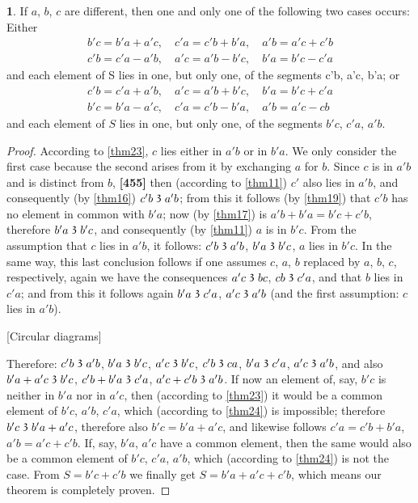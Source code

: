 \documentclass[leqno,hidelinks,a4paper]{article}
\theoremstyle{definition}
\newtheorem{satz}{\protect\satzname}
\newcommand{\satzname}{}
\renewcommand{\satzname}{\hspace{-4pt}.\ Satz}%
\renewcommand{\satzname}{\hspace{-4pt}.\ Theorem}%
\newcommand\partof{\mathrel{\raisebox{0.45ex}{$\mathfrak{3}$}}}
\begin{document}
\begin{satz}\label{thm25}
If $a$, $b$, $c$ are different, then one and only one of the following two cases occurs: Either
\begin{multline}
b'c=b'a+a'c,\quad c'a =c'b+b'a,\quad a'b = a'c+c'b \\
c'b=c'a-a'b,\quad a'c=a'b-b'c,\quad b'a=b'c-c'a
\end{multline}
and each element of S lies in one, but only one, of the segments c'b, a'c, b'a; or
\begin{multline}
c'b=c'a+a'b,\quad a'c=a'b+b'c,\quad b'a=b'c + c'a \\
b'c=b'a-a'c,\quad c'a=c'b-b'a,\quad a'b=a'c-cb
\end{multline}
and each element of $S$ lies in one, but only one, of the segments $b'c$, $c'a$, $a'b$.\end{satz}

\begin{proof}
According to \ref{thm23}, $c$ lies either in $a'b$ or in $b'a$. We only consider the first case because the second arises from it by exchanging $a$ for $b$.
Since $c$ is in $a'b$ and is distinct from $b$, \textbf{[455]} then (according to \ref{thm11}) $c'$ also lies in $a'b$, and consequently (by \ref{thm16}) $c'b \partof a'b$; from this it follows (by \ref{thm19}) that $c'b$ has no element in common with $b'a$; now (by \ref{thm17}) is $a'b+b'a=b'c+c'b$, therefore $b'a \partof b'c$, and consequently (by \ref{thm11}) $a$ is in $b'c$.
From the assumption that $c$ lies in $a'b$, it follows: $c'b \partof a'b$, $b'a \partof b'c$, $a$ lies in $b'c$.
In the same way, this last conclusion follows if one assumes $c$, $a$, $b$ replaced by $a$, $b$, $c$, respectively, again we have the consequences $a'c \partof bc$, $cb \partof c'a$, and that $b$ lies in $c'a$; and from this it follows again $b'a \partof c'a$, $a'c \partof a'b$ (and the first assumption: $c$ lies in $a'b$).

\bigskip

[Circular diagrams]

\bigskip

Therefore: $c'b \partof a'b$, $b'a \partof b'c$, $a'c \partof b'c$, $c'b \partof ca$, $b'a \partof c'a$, $a'c \partof a'b$, and also $b'a + a'c \partof b'c$, $c'b + b'a \partof c'a$, $a'c + c'b \partof a'b$.
If now an element of, say, $b'c$ is neither in $b'a$ nor in $a'c$, then (according to \ref{thm23}) it would be a common element of $b'c$, $a'b$, $c'a$, which (according to \ref{thm24}) is impossible; therefore $b'c \partof b'a + a'c$, therefore also $b'c=b'a + a'c$, and likewise follows $c'a=c'b+b'a$, $a'b=a'c+c'b$. If, say, $b'a$, $a'c$ have a common element, then the same would also be a common element of $b'c$, $c'a$, $a'b$, which (according to \ref{thm24}) is not the case.
From $S=b'c+c'b$ we finally get $S=b'a+a'c+c'b$, which means our theorem is completely proven.
\end{proof}
\end{document}
